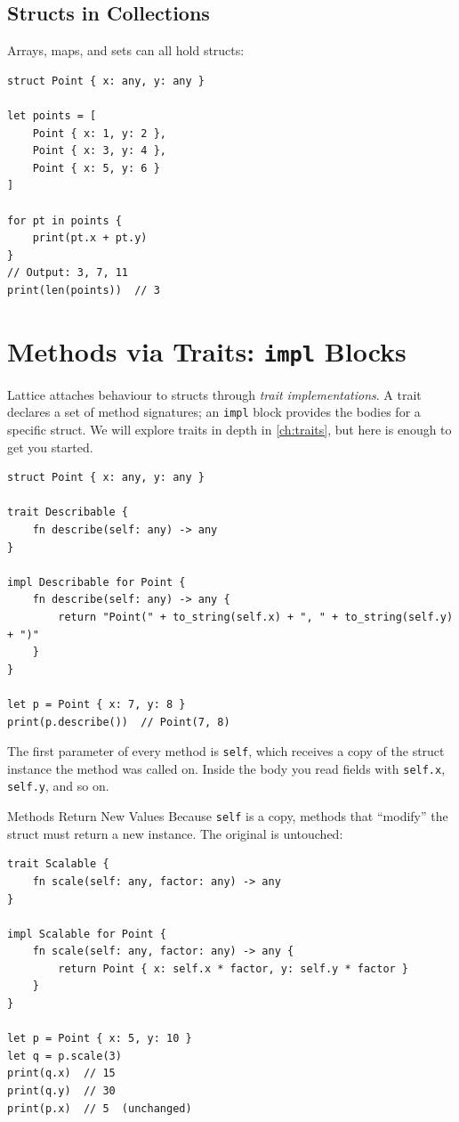 \subsection{Structs in Collections}

Arrays, maps, and sets can all hold structs:

\begin{lstlisting}[language=Lattice, caption={An array of structs}]
struct Point { x: any, y: any }

let points = [
    Point { x: 1, y: 2 },
    Point { x: 3, y: 4 },
    Point { x: 5, y: 6 }
]

for pt in points {
    print(pt.x + pt.y)
}
// Output: 3, 7, 11
print(len(points))  // 3
\end{lstlisting}

\section{Methods via Traits: \texttt{impl} Blocks}\label{sec:struct-methods}

Lattice attaches behaviour to structs through \emph{trait implementations}.
A trait declares a set of method signatures; an \lstinline|impl| block
provides the bodies for a specific struct. We will explore traits in depth
in \cref{ch:traits}, but here is enough to get you started.

\begin{lstlisting}[language=Lattice, caption={A trait and its implementation}]
struct Point { x: any, y: any }

trait Describable {
    fn describe(self: any) -> any
}

impl Describable for Point {
    fn describe(self: any) -> any {
        return "Point(" + to_string(self.x) + ", " + to_string(self.y) + ")"
    }
}

let p = Point { x: 7, y: 8 }
print(p.describe())  // Point(7, 8)
\end{lstlisting}

The first parameter of every method is \lstinline|self|, which receives
a copy of the struct instance the method was called on. Inside the body
you read fields with \lstinline|self.x|, \lstinline|self.y|, and so on.

\begin{notebox}{Methods Return New Values}
Because \lstinline|self| is a copy, methods that ``modify'' the struct
must return a new instance. The original is untouched:

\begin{lstlisting}[language=Lattice]
trait Scalable {
    fn scale(self: any, factor: any) -> any
}

impl Scalable for Point {
    fn scale(self: any, factor: any) -> any {
        return Point { x: self.x * factor, y: self.y * factor }
    }
}

let p = Point { x: 5, y: 10 }
let q = p.scale(3)
print(q.x)  // 15
print(q.y)  // 30
print(p.x)  // 5  (unchanged)
\end{lstlisting}
\end{notebox}

